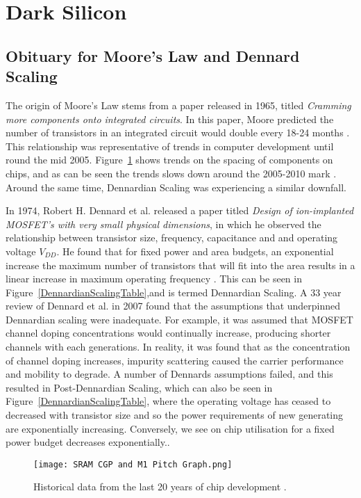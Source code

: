 	
	\section{Dark Silicon}
		\subsection{Obituary for Moore’s Law and Dennard Scaling}
			The origin of Moore's Law stems from a paper released in 1965, titled \textit{Cramming more components onto integrated circuits}. In this paper, Moore predicted the number of transistors in an integrated circuit would double every 18-24 months \cite{BookOfMoore}. This relationship was representative of trends in computer development until round the mid 2005. Figure~\ref{SRAMGraph} shows trends on the spacing of components on chips, and as can be seen the trends slows down around the 2005-2010 mark \cite{TheEndOfMooreTheis}.	Around the same time, Dennardian Scaling was experiencing a similar downfall.
			
			In 1974, Robert H. Dennard et al. released a paper titled \textit{Design of ion-implanted MOSFET's with very small physical dimensions}, in which he observed the relationship between transistor size, frequency, capacitance and and operating voltage $V_{DD}$. He found that for fixed power and area budgets, an exponential increase the maximum number of transistors that will fit into the area results in a linear increase in maximum operating frequency \cite{SmallDimensionMosfets}. This can be seen in Figure~\ref{DennardianScalingTable},and is termed Dennardian Scaling. A 33 year review of Dennard et al. in 2007 found that the assumptions that underpinned Dennardian scaling were inadequate. For example, it was assumed that MOSFET channel doping concentrations would continually increase, producing shorter channels with each generations. In reality, it was found that as the concentration of channel doping increases, impurity scattering caused the carrier performance and mobility to degrade. A number of Dennards assumptions failed, and this resulted in Post-Dennardian Scaling, which can also be seen in Figure~\ref{DennardianScalingTable}, where the operating voltage has ceased to decreased with transistor size and so the power requirements of new generating are exponentially increasing. Conversely, we see on chip utilisation for a fixed power budget decreases exponentially.\cite{ReviewOfDennard}.
			

			\begin{figure}

				\begin{center}
					\texttt{[image: SRAM CGP and M1 Pitch Graph.png]}
				
				\caption{Historical data from the last 20 years of chip development \cite{TheEndOfMooreTheis}.}
				\end{center}
				\label{SRAMGraph}
			\end{figure}
		
